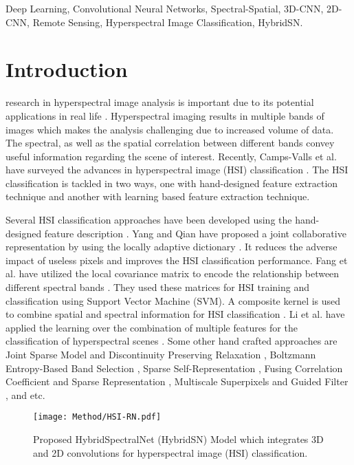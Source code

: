 \documentclass[journal]{IEEEtran}
\begin{document}
\begin{IEEEkeywords}
Deep Learning, Convolutional Neural Networks, Spectral-Spatial, 3D-CNN, 2D-CNN, Remote Sensing, Hyperspectral Image Classification, HybridSN.
\end{IEEEkeywords}



\section{Introduction} 
 research in hyperspectral image analysis is important due to its potential applications in real life \cite{chang2003hyperspectral}. Hyperspectral imaging results in multiple bands of images which makes the analysis challenging due to increased volume of data. The spectral, as well as the spatial correlation between different bands convey useful information regarding the scene of interest. Recently, Camps-Valls et al. have surveyed the advances in hyperspectral image (HSI) classification \cite{camps2014advances}. The HSI classification is tackled in two ways, one with hand-designed feature extraction technique and another with learning based feature extraction technique.

Several HSI classification approaches have been developed using the hand-designed feature description \cite{yang2018hyperspectral,fang2018new}. Yang and Qian have proposed a  joint collaborative representation by using the locally adaptive dictionary \cite{yang2018hyperspectral}. It reduces the adverse impact of useless pixels and improves the HSI classification performance. Fang et al. have utilized the local covariance matrix to encode the relationship between different spectral bands \cite{fang2018new}. They used these matrices for HSI training and classification using Support Vector Machine (SVM). A composite kernel is used to combine spatial and spectral information for HSI classification \cite{camps2006composite}. Li et al. have applied the learning over the combination of multiple features for the classification of hyperspectral scenes \cite{li2015multiple}.
Some other hand crafted approaches are 
Joint Sparse Model and Discontinuity Preserving Relaxation \cite{gao2018hyperspectral}, Boltzmann Entropy-Based Band Selection \cite{gao2018boltzmann}, Sparse Self-Representation \cite{hu2018band}, Fusing Correlation Coefficient and Sparse Representation \cite{tu2018hyperspectral}, Multiscale Superpixels and Guided Filter \cite{dundar2018sparse}, and etc. 

\begin{figure*}[!t]
\centering
\texttt{[image: Method/HSI-RN.pdf]}\caption{Proposed HybridSpectralNet (HybridSN) Model which integrates 3D and 2D convolutions for hyperspectral image (HSI) classification.}
\label{fig:model}
\end{figure*}
\end{document}
